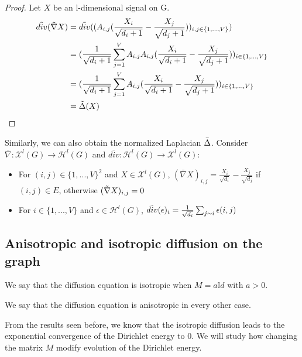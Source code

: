 \documentclass[12pt]{article}
\begin{document}
\begin{proof}
    Let $X$ be an l-dimensional signal on G.
    \begin{align*}
        \Tilde{div}(\Tilde{\nabla} X) &= \Tilde{div}((A_{i,j}(\frac{X_i}{\sqrt{d_i+1}} - \frac{X_j}{\sqrt{d_j+1}}))_{i,j \in \{1,...,V\}}) \\
                    &= (\frac{1}{\sqrt{d_i+1}}\sum_{j=1}^V A_{i,j} A_{i,j}(\frac{X_i}{\sqrt{d_i+1}} - \frac{X_j}{\sqrt{d_j+1}}))_{i \in \{1,...,V\}} \\
                    &= (\frac{1}{\sqrt{d_i+1}} \sum_{j=1}^V A_{i,j}(\frac{X_i}{\sqrt{d_i+1}} - \frac{X_j}{\sqrt{d_j+1}}))_{i \in \{1,...,V\}} \\
                    &= \Tilde{\Delta}(X)
    \end{align*}
\end{proof}

Similarly, we can also obtain the normalized Laplacian $\Bar{\Delta}$.
Consider $\bar{\nabla}: \mathcal{X}^l(G) \longrightarrow \mathcal{H}^l(G)$ and $\bar{div}: \mathcal{H}^l(G) \longrightarrow \mathcal{X}^l(G)$:
\begin{itemize}
    \item For $(i,j) \in \{1,...,V\}^2$ and $X \in \mathcal{X}^l(G)$, $(\bar{\nabla} X)_{i,j} = \frac{X_i}{\sqrt{d_i}} - \frac{X_j}{\sqrt{d_j}}$ if $(i,j) \in E$, otherwise $(\Tilde{\nabla} X)_{i,j} = 0$
    \item For $i \in \{1,...,V\}$ and $\epsilon \in \mathcal{H}^l(G)$, $\Tilde{div}(\epsilon)_i = \frac{1}{\sqrt{d_i}}\sum_{j \sim i} \epsilon(i,j)$
\end{itemize}


\subsection{Anisotropic and isotropic diffusion on the graph}

\begin{definition}
    We say that the diffusion equation is isotropic when $M = a\mathbb{I}d$ with $a > 0$.
\end{definition}

\begin{definition}
    We say that the diffusion equation is anisotropic in every other case.
\end{definition}

From the results seen before, we know that the isotropic diffusion leads to the exponential convergence of the Dirichlet energy to 0. We will study how changing the matrix $M$ modify evolution of the Dirichlet energy.\\
\end{document}
